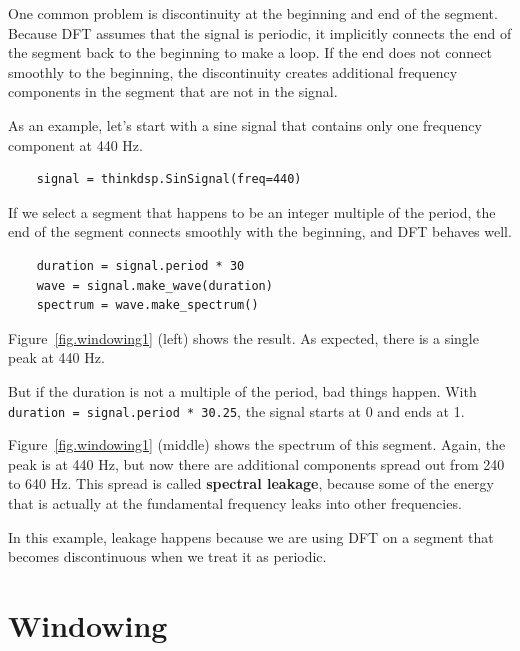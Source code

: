 \documentclass[12pt]{book}
\begin{document}
One common problem is discontinuity at the beginning and end of the
segment.  Because DFT assumes that the signal is periodic, it
implicitly connects the end of the segment back to the beginning to
make a loop.  If the end does not connect smoothly to the beginning,
the discontinuity creates additional frequency components in the
segment that are not in the signal.

As an example, let's start with a sine signal that contains only
one frequency component at 440 Hz.

\begin{verbatim}
    signal = thinkdsp.SinSignal(freq=440)
\end{verbatim}

If we select a segment that happens to be an integer multiple of
the period, the end of the segment connects smoothly with the
beginning, and DFT behaves well.

\begin{verbatim}
    duration = signal.period * 30
    wave = signal.make_wave(duration)
    spectrum = wave.make_spectrum()
\end{verbatim}

Figure~\ref{fig.windowing1} (left) shows the result.  As expected,
there is a single peak at 440 Hz.

But if the duration is not a multiple of the period, bad things
happen.  With {\tt duration = signal.period * 30.25}, the signal
starts at 0 and ends at 1.

Figure~\ref{fig.windowing1} (middle) shows
the spectrum of this segment.  Again, the peak is at 440 Hz, but now
there are additional components spread out from 240 to 640 Hz.  This
spread is called {\bf spectral leakage}, because some of the energy that
is actually at the fundamental frequency leaks into other frequencies.

In this example, leakage happens because we are using DFT on a segment
that becomes discontinuous when we treat it as periodic.


\section{Windowing}
\end{document}
